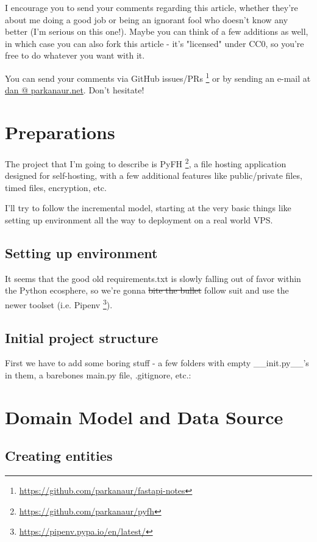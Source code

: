 \documentclass[14pt]{extarticle}
\begin{document}
I encourage you to send your comments regarding this article, whether they're about me doing a good job or being an ignorant fool who doesn't know any better (I'm serious on this one!). Maybe you can think of a few additions as well, in which case you can also fork this article - it's "licensed" under CC0, so you're free to do whatever you want with it.

You can send your comments via GitHub issues/PRs \footnote{\href{https://github.com/parkanaur/fastapi-notes}{https://github.com/parkanaur/fastapi-notes}}
or by sending an e-mail at {\href{mailto:dan@parkanaur.net}{dan @ parkanaur.net}}. Don't hesitate!

\section{Preparations}

The project that I'm going to describe is PyFH \footnote{\href{https://github.com/parkanaur/pyfh}{https://github.com/parkanaur/pyfh}}, a file hosting application designed for self-hosting, with a few additional features like public/private files, timed files, encryption, etc.

I'll try to follow the incremental model, starting at the very basic things like setting up environment all the way to deployment on a real world VPS.

\subsection{Setting up environment}

It seems that the good old requirements.txt is slowly falling out of favor within the Python ecosphere, so we're gonna \sout{bite the bullet} follow suit and use the newer toolset (i.e. Pipenv \footnote{\href{https://pipenv.pypa.io/en/latest/}{https://pipenv.pypa.io/en/latest/}}).

\subsection{Initial project structure}
First we have to add some boring stuff - a few folders with empty \_\_init.py\_\_'s in them, a barebones main.py file, .gitignore, etc.:

\section{Domain Model and Data Source}

\subsection{Creating entities}
\end{document}
